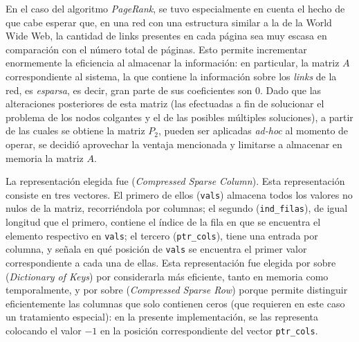     En el caso del algoritmo \emph{PageRank}, se tuvo especialmente en cuenta el hecho de que cabe esperar que, en una red con una estructura similar a la de la World Wide Web, la cantidad de links presentes en cada página sea muy escasa en comparación con el número total de páginas. Esto permite incrementar enormemente la eficiencia al almacenar la información: en particular, la matriz $A$ correspondiente al sistema, la que contiene la información sobre los \emph{links} de la red, es \emph{esparsa}, es decir, gran parte de sus coeficientes son $0$. Dado que las alteraciones posteriores de esta matriz (las efectuadas a fin de solucionar el problema de los nodos colgantes y el de las posibles múltiples soluciones), a partir de las cuales se obtiene la matriz $P_2$, pueden ser aplicadas \emph{ad-hoc} al momento de operar, se decidió aprovechar la ventaja mencionada y limitarse a almacenar en memoria la matriz $A$.

    La representación elegida fue  (\emph{Compressed Sparse Column}). Esta representación consiste en tres vectores. El primero de ellos (\texttt{vals}) almacena todos los valores no nulos de la matriz, recorriéndola por columnas; el segundo (\texttt{ind\_filas}), de igual longitud que el primero, contiene el índice de la fila en que se encuentra el elemento respectivo en \texttt{vals}; el tercero (\texttt{ptr\_cols}), tiene una entrada por columna, y señala en qué posición de \texttt{vals} se encuentra el primer valor correspondiente a cada una de ellas. Esta representación fue elegida por sobre  (\emph{Dictionary of Keys}) por considerarla más eficiente, tanto en memoria como temporalmente, y por sobre  (\emph{Compressed Sparse Row}) porque permite distinguir eficientemente las columnas que solo contienen ceros (que requieren en este caso un tratamiento especial): en la presente implementación, se las representa colocando el valor $-1$ en la posición correspondiente del vector \texttt{ptr\_cols}.